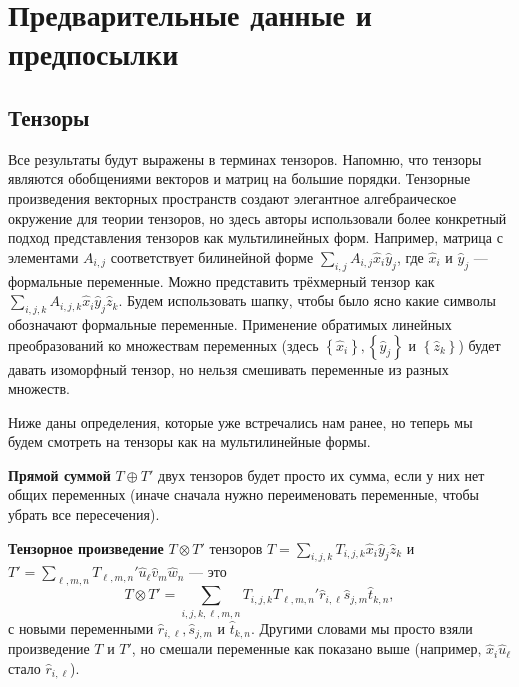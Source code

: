 \section{Предварительные данные и предпосылки}

\subsection{Тензоры}

Все результаты будут выражены в терминах тензоров. Напомню, что тензоры являются обобщениями векторов и матриц на большие порядки. Тензорные произведения векторных пространств создают элегантное алгебраическое окружение для теории тензоров, но здесь авторы использовали более конкретный подход представления тензоров как мультилинейных форм. Например, матрица с элементами $A_{i,j}$ соответствует билинейной форме $\sum_{i,j} A_{i,j} \widehat{x}_i \widehat{y}_j$, где $\widehat{x}_i$ и $\widehat{y}_j$ --- формальные переменные. Можно представить трёхмерный тензор как $\sum_{i,j,k} A_{i,j,k} \widehat{x}_i \widehat{y}_j \widehat{z}_k$. Будем использовать шапку, чтобы было ясно какие символы обозначают формальные переменные. Применение обратимых линейных преобразований ко множествам переменных (здесь $\left\{ \widehat{x}_i \right\}, \left\{ \widehat{y}_j \right\}$ и $\left\{ \widehat{z}_k \right\}$) будет давать изоморфный тензор, но нельзя смешивать переменные из разных множеств. 

Ниже даны определения, которые уже встречались нам ранее, но теперь мы будем смотреть на тензоры как на мультилинейные формы.
\begin{definition}
  \textbf{Прямой суммой} $T \oplus T'$ двух тензоров будет просто их сумма, если у них нет общих переменных (иначе сначала нужно переименовать переменные, чтобы убрать все пересечения). 
\end{definition}

\begin{definition}
  \textbf{Тензорное произведение} $T \otimes T'$ тензоров $T = \sum_{i,j,k} T_{i,j,k} \widehat{x}_i \widehat{y}_j \widehat{z}_k$ и $T' = \sum_{\ell,m,n} T_{\ell,m,n}' \widehat{u}_\ell \widehat{v}_m \widehat{w}_n$ --- это
  \[
  	T \otimes T' = \sum_{i,j,k,\ell,m,n} T_{i,j,k} T_{\ell,m,n}' \widehat{r}_{i,\ell} \widehat{s}_{j,m} \widehat{t}_{k,n},
  \]
  с новыми переменными $\widehat{r}_{i,\ell}, \widehat{s}_{j,m}$ и $\widehat{t}_{k,n}$. Другими словами мы просто взяли произведение $T$ и $T'$, но смешали переменные как показано выше (например, $\widehat{x}_i \widehat{u}_\ell$ стало $\widehat{r}_{i,\ell}$). 
\end{definition}

